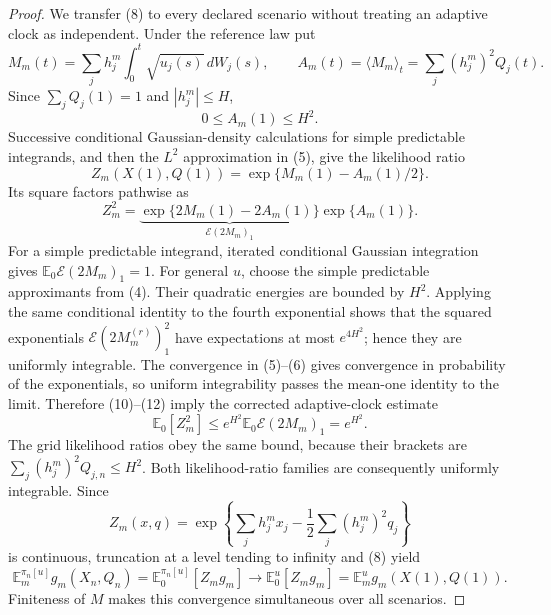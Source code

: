\documentclass{article}
\begin{document}
\begin{proof}
We transfer (8) to every declared scenario without treating an adaptive clock as independent.  Under the reference law put
\[
 M_m(t)=\sum_jh_j^m\int_0^t\sqrt{u_j(s)}\,dW_j(s),
 \qquad
 A_m(t)=\langle M_m\rangle_t
 =\sum_j(h_j^m)^2Q_j(t).                                         \tag{9}
\]
Since \(\sum_jQ_j(1)=1\) and \(|h_j^m|\leq H\),
\[
 0\leq A_m(1)\leq H^2.                                          \tag{10}
\]
Successive conditional Gaussian-density calculations for simple predictable integrands, and then the \(L^2\) approximation in (5), give the likelihood ratio
\[
 Z_m(X(1),Q(1))=\exp\{M_m(1)-A_m(1)/2\}.                         \tag{11}
\]
Its square factors pathwise as
\[
 Z_m^2=
 \underbrace{\exp\{2M_m(1)-2A_m(1)\}}_{\mathcal E(2M_m)_1}
 \exp\{A_m(1)\}.                                                \tag{12}
\]
For a simple predictable integrand, iterated conditional Gaussian integration gives \(\mathbb E_0\mathcal E(2M_m)_1=1\).  For general \(u\), choose the simple predictable approximants from (4).  Their quadratic energies are bounded by \(H^2\).  Applying the same conditional identity to the fourth exponential shows that the squared exponentials \(\mathcal E(2M_m^{(r)})_1^2\) have expectations at most \(e^{4H^2}\); hence they are uniformly integrable.  The convergence in (5)--(6) gives convergence in probability of the exponentials, so uniform integrability passes the mean-one identity to the limit.  Therefore (10)--(12) imply the corrected adaptive-clock estimate
\[
 \mathbb E_0[Z_m^2]
 \leq e^{H^2}\mathbb E_0\mathcal E(2M_m)_1=e^{H^2}.              \tag{13}
\]
The grid likelihood ratios obey the same bound, because their brackets are \(\sum_j(h_j^m)^2Q_{j,n}\leq H^2\).  Both likelihood-ratio families are consequently uniformly integrable.  Since
\[
 Z_m(x,q)=\exp\!\left\{\sum_jh_j^mx_j-\frac12\sum_j(h_j^m)^2q_j\right\} \tag{14}
\]
is continuous, truncation at a level tending to infinity and (8) yield
\[
 \mathbb E_m^{\pi_n[u]}g_m(X_n,Q_n)
 =\mathbb E_0^{\pi_n[u]}[Z_mg_m]
 \longrightarrow
 \mathbb E_0^u[Z_mg_m]
 =\mathbb E_m^ug_m(X(1),Q(1)).                                   \tag{15}
\]
Finiteness of \(M\) makes this convergence simultaneous over all scenarios.


\end{proof}
\end{document}
